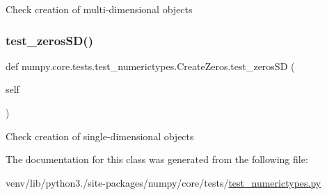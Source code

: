 \begin{DoxyVerb}Check creation of multi-dimensional objects\end{DoxyVerb}
 \mbox{\label{classnumpy_1_1core_1_1tests_1_1test__numerictypes_1_1CreateZeros_a3af5d2900a14617b034a0374ca82a53d}} 
\subsubsection{\texorpdfstring{test\+\_\+zeros\+S\+D()}{test\_zerosSD()}}
{\footnotesize\ttfamily def numpy.\+core.\+tests.\+test\+\_\+numerictypes.\+Create\+Zeros.\+test\+\_\+zeros\+SD (\begin{DoxyParamCaption}\item[{}]{self }\end{DoxyParamCaption})}

\begin{DoxyVerb}Check creation of single-dimensional objects\end{DoxyVerb}
 

The documentation for this class was generated from the following file\+:\begin{DoxyCompactItemize}
\item 
venv/lib/python3./site-\/packages/numpy/core/tests/\hyperlink{test__numerictypes_8py}{test\+\_\+numerictypes.\+py}\end{DoxyCompactItemize}
